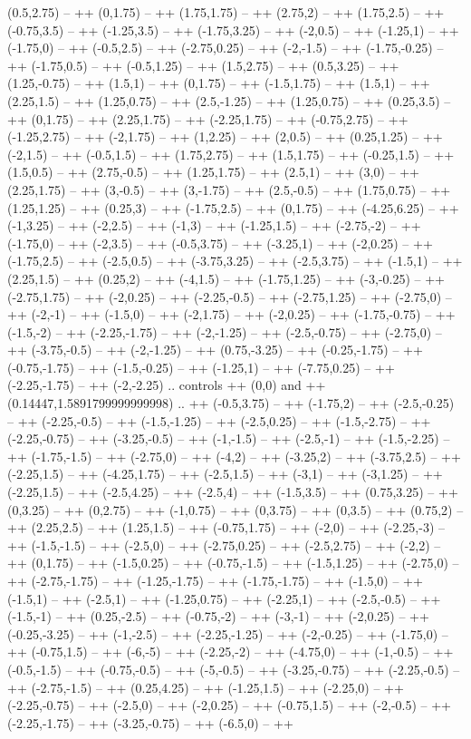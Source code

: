 (0.5,2.75) -- ++ (0,1.75) -- ++ (1.75,1.75) -- ++ (2.75,2) -- ++ (1.75,2.5) -- ++ (-0.75,3.5) -- ++ (-1.25,3.5) -- ++ (-1.75,3.25) -- ++ (-2,0.5) -- ++ (-1.25,1) -- ++ (-1.75,0) -- ++ (-0.5,2.5) -- ++ (-2.75,0.25) -- ++ (-2,-1.5) -- ++ (-1.75,-0.25) -- ++ (-1.75,0.5) -- ++ (-0.5,1.25) -- ++ (1.5,2.75) -- ++ (0.5,3.25) -- ++ (1.25,-0.75) -- ++ (1.5,1) -- ++ (0,1.75) -- ++ (-1.5,1.75) -- ++ (1.5,1) -- ++ (2.25,1.5) -- ++ (1.25,0.75) -- ++ (2.5,-1.25) -- ++ (1.25,0.75) -- ++ (0.25,3.5) -- ++ (0,1.75) -- ++ (2.25,1.75) -- ++ (-2.25,1.75) -- ++ (-0.75,2.75) -- ++ (-1.25,2.75) -- ++ (-2,1.75) -- ++ (1,2.25) -- ++ (2,0.5) -- ++ (0.25,1.25) -- ++ (-2,1.5) -- ++ (-0.5,1.5) -- ++ (1.75,2.75) -- ++ (1.5,1.75) -- ++ (-0.25,1.5) -- ++ (1.5,0.5) -- ++ (2.75,-0.5) -- ++ (1.25,1.75) -- ++ (2.5,1) -- ++ (3,0) -- ++ (2.25,1.75) -- ++ (3,-0.5) -- ++ (3,-1.75) -- ++ (2.5,-0.5) -- ++ (1.75,0.75) -- ++ (1.25,1.25) -- ++ (0.25,3) -- ++ (-1.75,2.5) -- ++ (0,1.75) -- ++ (-4.25,6.25) -- ++ (-1,3.25) -- ++ (-2,2.5) -- ++ (-1,3) -- ++ (-1.25,1.5) -- ++ (-2.75,-2) -- ++ (-1.75,0) -- ++ (-2,3.5) -- ++ (-0.5,3.75) -- ++ (-3.25,1) -- ++ (-2,0.25) -- ++ (-1.75,2.5) -- ++ (-2.5,0.5) -- ++ (-3.75,3.25) -- ++ (-2.5,3.75) -- ++ (-1.5,1) -- ++ (2.25,1.5) -- ++ (0.25,2) -- ++ (-4,1.5) -- ++ (-1.75,1.25) -- ++ (-3,-0.25) -- ++ (-2.75,1.75) -- ++ (-2,0.25) -- ++ (-2.25,-0.5) -- ++ (-2.75,1.25) -- ++ (-2.75,0) -- ++ (-2,-1) -- ++ (-1.5,0) -- ++ (-2,1.75) -- ++ (-2,0.25) -- ++ (-1.75,-0.75) -- ++ (-1.5,-2) -- ++ (-2.25,-1.75) -- ++ (-2,-1.25) -- ++ (-2.5,-0.75) -- ++ (-2.75,0) -- ++ (-3.75,-0.5) -- ++ (-2,-1.25) -- ++ (0.75,-3.25) -- ++ (-0.25,-1.75) -- ++ (-0.75,-1.75) -- ++ (-1.5,-0.25) -- ++ (-1.25,1) -- ++ (-7.75,0.25) -- ++ (-2.25,-1.75) -- ++ (-2,-2.25) .. controls ++ (0,0) and ++ (0.14447,1.5891799999999998) .. ++ (-0.5,3.75) -- ++ (-1.75,2) -- ++ (-2.5,-0.25) -- ++ (-2.25,-0.5) -- ++ (-1.5,-1.25) -- ++ (-2.5,0.25) -- ++ (-1.5,-2.75) -- ++ (-2.25,-0.75) -- ++ (-3.25,-0.5) -- ++ (-1,-1.5) -- ++ (-2.5,-1) -- ++ (-1.5,-2.25) -- ++ (-1.75,-1.5) -- ++ (-2.75,0) -- ++ (-4,2) -- ++ (-3.25,2) -- ++ (-3.75,2.5) -- ++ (-2.25,1.5) -- ++ (-4.25,1.75) -- ++ (-2.5,1.5) -- ++ (-3,1) -- ++ (-3,1.25) -- ++ (-2.25,1.5) -- ++ (-2.5,4.25) -- ++ (-2.5,4) -- ++ (-1.5,3.5) -- ++ (0.75,3.25) -- ++ (0,3.25) -- ++ (0,2.75) -- ++ (-1,0.75) -- ++ (0,3.75) -- ++ (0,3.5) -- ++ (0.75,2) -- ++ (2.25,2.5) -- ++ (1.25,1.5) -- ++ (-0.75,1.75) -- ++ (-2,0) -- ++ (-2.25,-3) -- ++ (-1.5,-1.5) -- ++ (-2.5,0) -- ++ (-2.75,0.25) -- ++ (-2.5,2.75) -- ++ (-2,2) -- ++ (0,1.75) -- ++ (-1.5,0.25) -- ++ (-0.75,-1.5) -- ++ (-1.5,1.25) -- ++ (-2.75,0) -- ++ (-2.75,-1.75) -- ++ (-1.25,-1.75) -- ++ (-1.75,-1.75) -- ++ (-1.5,0) -- ++ (-1.5,1) -- ++ (-2.5,1) -- ++ (-1.25,0.75) -- ++ (-2.25,1) -- ++ (-2.5,-0.5) -- ++ (-1.5,-1) -- ++ (0.25,-2.5) -- ++ (-0.75,-2) -- ++ (-3,-1) -- ++ (-2,0.25) -- ++ (-0.25,-3.25) -- ++ (-1,-2.5) -- ++ (-2.25,-1.25) -- ++ (-2,-0.25) -- ++ (-1.75,0) -- ++ (-0.75,1.5) -- ++ (-6,-5) -- ++ (-2.25,-2) -- ++ (-4.75,0) -- ++ (-1,-0.5) -- ++ (-0.5,-1.5) -- ++ (-0.75,-0.5) -- ++ (-5,-0.5) -- ++ (-3.25,-0.75) -- ++ (-2.25,-0.5) -- ++ (-2.75,-1.5) -- ++ (0.25,4.25) -- ++ (-1.25,1.5) -- ++ (-2.25,0) -- ++ (-2.25,-0.75) -- ++ (-2.5,0) -- ++ (-2,0.25) -- ++ (-0.75,1.5) -- ++ (-2,-0.5) -- ++ (-2.25,-1.75) -- ++ (-3.25,-0.75) -- ++ (-6.5,0) -- ++ 